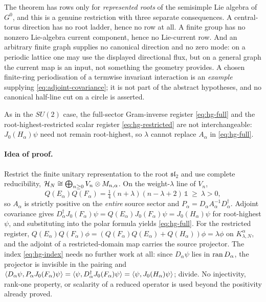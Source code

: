 \begin{scope}
\label{scope:soft-index-compact-G}
The theorem has rows only for \emph{represented roots} of the semisimple Lie
algebra of $G^0$, and this is a genuine restriction with three separate
consequences. A central-torus direction has no root ladder, hence no row at
all. A finite group has no nonzero Lie-algebra current component, hence no
Lie-current row. And an arbitrary finite graph supplies no canonical
direction and no zero mode: on a periodic lattice one may use the displayed
directional flux, but on a general graph the current map is an input, not
something the geometry provides. A chosen finite-ring periodisation of a
termwise invariant interaction is an \emph{example} supplying
\cref{eq:adjoint-covariance}; it is not part of the abstract hypotheses, and
no canonical half-line cut on a circle is asserted.

As in the $SU(2)$ case, the full-sector Gram-inverse register
\cref{eq:hg-full} and the root-highest-restricted scalar register
\cref{eq:hg-restricted} are not interchangeable: $J_0(H_\alpha)\psi$ need not
remain root-highest, so $\lambda$ cannot replace $A_\alpha$ in
\cref{eq:hg-full}.
\end{scope}

\paragraph{Idea of proof.} Restrict the finite unitary representation to the
root $\mathfrak{sl}_2$ and use complete reducibility,
$\mathcal{H}_N\cong\bigoplus_{n\ge0}V_n\otimes M_{n,\alpha}$. On the weight-$\lambda$
line of $V_n$,
\[
  Q(E_\alpha)Q(F_\alpha)=\tfrac14(n+\lambda)(n-\lambda+2)\,\mathbb 1
  \ \ge\ \lambda>0,
\]
so $A_\alpha$ is strictly positive on the \emph{entire} source sector and
$P_\alpha=D_\alpha A_\alpha^{-1}D_\alpha^\dagger$. Adjoint covariance gives
$D_\alpha^\dagger J_0(F_\alpha)\psi=Q(E_\alpha)J_0(F_\alpha)\psi
=J_0(H_\alpha)\psi$ for root-highest $\psi$, and substituting into the polar
formula yields \cref{eq:hg-full}. For the restricted register,
$Q(E_\alpha)Q(F_\alpha)\phi=(Q(F_\alpha)Q(E_\alpha)+Q(H_\alpha))\phi
=\lambda\phi$ on $K^\alpha_{\lambda,N}$, and the adjoint of a
restricted-domain map carries the source projector. The index
\cref{eq:hg-index} needs no further work at all: since $D_\alpha\psi$ lies in
$\operatorname{ran} D_\alpha$, the projector is invisible in the pairing and
$\langle D_\alpha\psi,P_\alpha J_0(F_\alpha)\psi\rangle
=\langle \psi,D_\alpha^\dagger J_0(F_\alpha)\psi\rangle
=\langle \psi,J_0(H_\alpha)\psi\rangle$; divide. No injectivity, rank-one property,
or scalarity of a reduced operator is used beyond the positivity already
proved.

